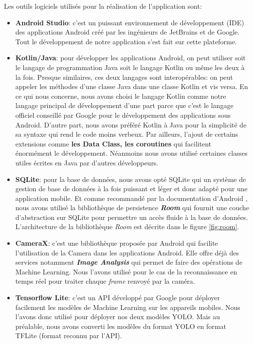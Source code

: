     Les outils logiciels utilisés pour la réalisation de l’application sont:
    \begin{itemize}
        \item \textbf{Android Studio}: c’est un puissant environnement de développement (IDE) des applications Android créé par les ingénieurs de JetBrains et de Google. Tout le développement de notre application s’est fait sur cette plateforme. 
        
        \item \textbf{Kotlin/Java}: pour développer les applications Android, on peut utiliser soit le langage de programmation Java soit le langage Kotlin ou même les deux à la fois. Presque similaires, ces deux langages sont interopérables: on peut appeler les méthodes d'une classe Java dans une classe Kotlin et vis versa. En ce qui nous concerne, nous avons choisi le langage Kotlin comme notre langage principal de développement d’une part parce que c’est le langage officiel conseillé par Google pour le développement des applications sous Android. D’autre part, nous avons préféré Kotlin à Java pour la simplicité de sa syntaxe qui rend le code moins verbeux. Par ailleurs, l’ajout de certains extensions comme \textbf{les Data Class, les coroutines} qui facilitent énormément le développement. Néanmoins nous avons utilisé certaines classes utiles écrites en Java par d'autres développeurs.  
        
        \item \textbf{SQLite}: pour la base de données, nous avons opté SQLite qui un système de gestion de base de données à la fois puissant et léger et donc adapté pour une application mobile. Et comme recommandé par la documentation d'Android \cite{androiddocs}, nous avons utilisé la bibliothèque de persistence \textbf{\textit{Room}} qui fournit une couche d'abstraction sur SQLite pour permettre un accès fluide à la base de données.
        L'architecture de la bibliothèque \textit{Room} est décrite dans le figure \ref{fig:room}.

        \item \textbf{CameraX}: c'est une bibliothèque proposée par Android qui facilite l'utilisation de la Camera dans les applications Android. Elle offre déjà des services notamment \textbf{\textit{Image Analysis}} qui permet de faire des opérations de Machine Learning. Nous l'avons utilisé pour le cas de la reconnaissance en temps réel pour traiter chaque \textit{frame} renvoyé par la caméra.
        
        \item \textbf{Tensorflow Lite}: c'est un API développé par Google pour déployer facilement les modèles de Machine Learning sur les appareils mobiles. Nous l'avons donc utilisé pour déployer nos deux modèles YOLO. Mais au préalable, nous avons converti les modèles du format YOLO en format TFLite (format reconnu par l'API).
        

\end{itemize}
